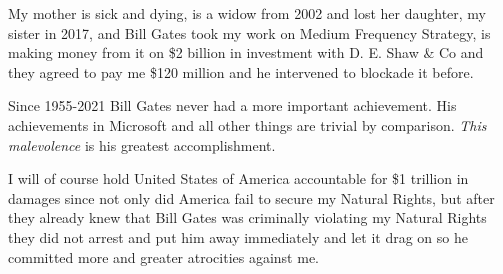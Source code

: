 \documentclass{amsart}
\begin{document}
My mother is sick and dying, is a widow from 2002 and lost her daughter, my sister in 2017, and Bill Gates took my work on Medium Frequency Strategy, is making money from it on \$2 billion in investment with D. E. Shaw & Co and they agreed to pay me \$120 million and he intervened to blockade it before.

Since 1955-2021 Bill Gates never had a more important achievement.  His achievements in Microsoft and all other things are trivial by comparison.  {\em This malevolence} is his greatest accomplishment.  

I will of course hold United States of America accountable for \$1 trillion in damages since not only did America fail to secure my Natural Rights, but after they already knew that Bill Gates was criminally violating my Natural Rights they did not arrest and put him away immediately and let it drag on so he committed more and greater atrocities against me.




\begin{thebibliography}{CCC}
\end{thebibliography}
\end{document}
